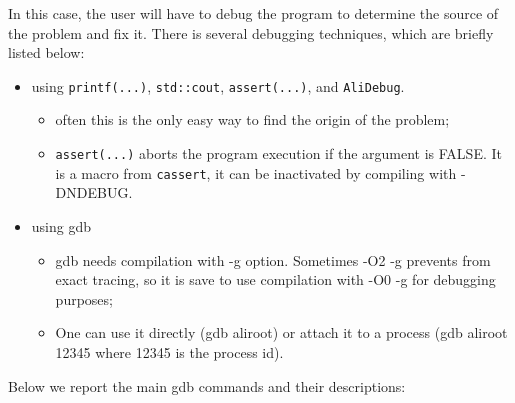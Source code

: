 \documentclass[12pt,a4paper,twoside]{article}
\begin{document}
In this case, the user will have to debug the program to determine the
source of the problem and fix it. There is several debugging
techniques, which are briefly listed below:

\begin{itemize}
\item using \texttt{printf(...)}, \texttt{std::cout}, \texttt{assert(...)}, and
  \texttt{AliDebug}.
  \begin{itemize}
  \item often this is the only easy way to find the origin of the
    problem;
  \item \texttt{assert(...)} aborts the program execution if the
    argument is FALSE. It is a macro from \texttt{cassert}, it can be
    inactivated by compiling with -DNDEBUG.
  \end{itemize}
\item using gdb
  \begin{itemize}
  \item gdb needs compilation with -g option. Sometimes -O2 -g
    prevents from exact tracing, so it is save to use compilation with
    -O0 -g for debugging purposes;
  \item One can use it directly (gdb aliroot) or attach it to a
    process (gdb aliroot 12345 where 12345 is the process id).
  \end{itemize}
\end{itemize}

Below we report the main gdb commands and their descriptions:
\end{document}
